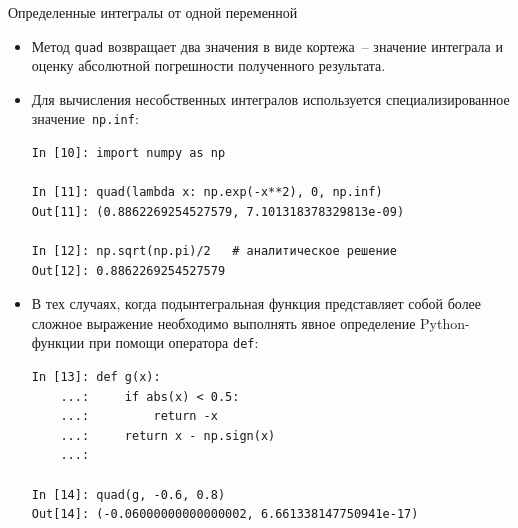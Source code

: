 \documentclass[aspectratio=169, mathserif]{beamer}	%
\begin{document}
\begin{frame}[fragile]{Определенные интегралы от одной переменной}
\scriptsize
\begin{itemize}
	\item Метод \texttt{quad} возвращает два значения в виде кортежа~-- значение интеграла и оценку абсолютной погрешности полученного результата. 

	\item Для вычисления несобственных интегралов используется специализированное значение~\texttt{np.inf}:

\begin{lstlisting}[language=iPython, numbers=none, frame=none, ]
In [10]: import numpy as np

In [11]: quad(lambda x: np.exp(-x**2), 0, np.inf)
Out[11]: (0.8862269254527579, 7.101318378329813e-09)

In [12]: np.sqrt(np.pi)/2   # аналитическое решение
Out[12]: 0.8862269254527579
\end{lstlisting}

	\item В тех случаях, когда подынтегральная функция представляет собой более сложное выражение необходимо выполнять явное определение Python-функции при помощи оператора \lstinline[language=iPython]|def|:

\begin{lstlisting}[language=iPython, numbers=none, frame=none, ]
In [13]: def g(x):
    ...:     if abs(x) < 0.5:
    ...:         return -x
    ...:     return x - np.sign(x)
    ...:

In [14]: quad(g, -0.6, 0.8)
Out[14]: (-0.06000000000000002, 6.661338147750941e-17)
\end{lstlisting}
\end{itemize}
\vfil
\end{frame}
\end{document}
